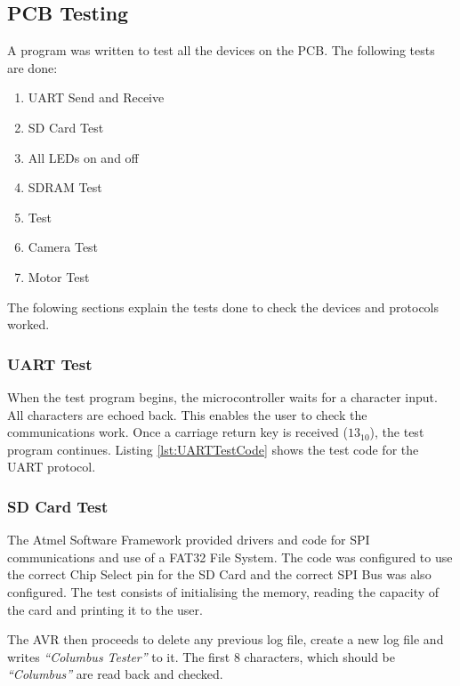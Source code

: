 
\subsection{PCB Testing}
A program was written to test all the devices on the PCB. The following tests are done:
\begin{enumerate}
\item UART Send and Receive
\item SD Card Test
\item All LEDs on and off
\item SDRAM Test
\item \itc Test
\item Camera Test
\item Motor Test
\end{enumerate}
The folowing sections explain the tests done to check the devices and protocols worked.

\subsubsection{UART Test}
When the test program begins, the microcontroller waits for a character input. All characters are echoed back. This enables the user to check the communications work. Once a carriage return key is received ($13_{10}$), the test program continues. Listing \ref{lst:UARTTestCode} shows the test code for the UART protocol.




\subsubsection{SD Card Test}
The Atmel Software Framework \citep{Atmel:ASF} provided drivers and code for SPI communications and use of a FAT32 File System. The code was configured to use the correct Chip Select pin for the SD Card and the correct SPI Bus was also configured. The test consists of initialising the memory, reading the capacity of the card and printing it to the user. 

The AVR then proceeds to delete any previous log file, create a new log file and writes \textit{``Columbus Tester''} to it. The first 8 characters, which should be \textit{``Columbus''} are read back and checked.


